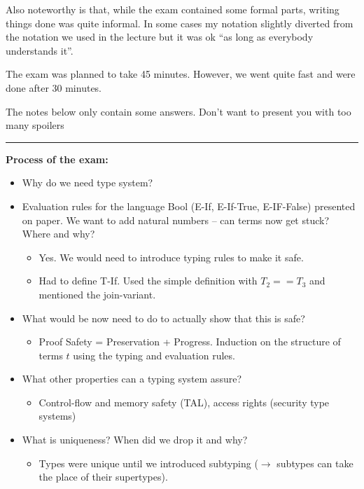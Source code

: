 \documentclass[11pt, a4paper]{article}
\begin{document}
Also noteworthy is that, while the exam contained some formal parts, writing things done was quite informal. In some cases my notation slightly diverted from the notation we used in the lecture but it was ok ``as long as everybody understands it''.

The exam was planned to take 45 minutes. However, we went quite fast and were done after 30 minutes.

The notes below only contain some answers. Don't want to present you with too many spoilers %

\bigskip \hrule \bigskip

\noindent \textbf{Process of the exam: }

\begin{itemize}
\item Why do we need type system?
\item Evaluation rules for the language Bool (E-If, E-If-True, E-IF-False) presented on paper. We want to add natural numbers -- can terms now get stuck? Where and why?
\begin{itemize}
   \item Yes. We would need to introduce typing rules to make it safe.
   \item Had to define T-If. Used the simple definition with $T_2 == T_3$ and mentioned the join-variant.
\end{itemize}
\item What would be now need to do to actually show that this is safe?
\begin{itemize}
   \item Proof Safety = Preservation + Progress. Induction on the structure of terms $t$ using the typing and evaluation rules.
\end{itemize}
\item What other properties can a typing system assure?
\begin{itemize}
   \item Control-flow and memory safety (TAL), access rights (security type systems)
\end{itemize}
\item What is uniqueness? When did we drop it and why?
\begin{itemize}
   \item Types were unique until we introduced subtyping ($\rightarrow$ subtypes can take the place of their supertypes).
\end{itemize}

\end{itemize}
\end{document}

